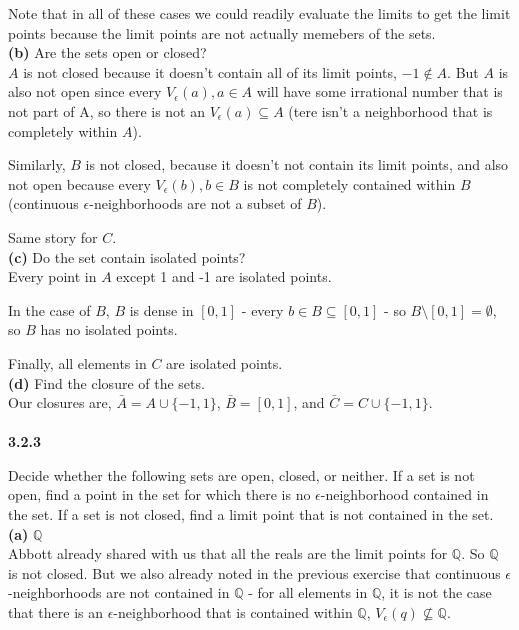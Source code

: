 Note that in all of these cases we could readily evaluate the limits to get the limit points because the limit points
are not actually memebers of the sets.
\\


\textbf{(b)} Are the sets open or closed?
\\

$A$ is not closed because it doesn't contain all of its limit points, $-1 \notin A$.
But $A$ is also not open since every $V_\epsilon (a), a\in A$ will have some irrational number that is not part of A,
so there is not an $V_{\epsilon} (a) \subseteq A$ (tere isn't a neighborhood that is completely within $A$).

Similarly, $B$ is not closed, because it doesn't not contain its limit points, and also not open
because every $V_\epsilon (b), b\in B$ is not completely contained within $B$
(continuous $\epsilon$-neighborhoods are not a subset of $B$).

Same story for $C$.
\\


\textbf{(c)} Do the set contain isolated points?
\\


Every point in $A$ except 1 and -1 are isolated points.

In the case of $B$, $B$ is dense in $[0,1]$ - every $b\in B \subseteq [0,1]$ - so $B \setminus [0,1] = \emptyset$, so
$B$ has no isolated points.

Finally, all elements in $C$ are isolated points.
\\

\textbf{(d)} Find the closure of the sets.
\\

Our closures are, $\bar{A} = A \cup \{-1, 1\}$, $\bar{B} = [0,1]$, and $\bar{C} = C \cup \{-1, 1\}$.
\\~\\



\textbf{3.2.3}

Decide whether the following sets are open, closed, or neither.
If a set is not open, find a point in the set for which there is no $\epsilon$-neighborhood contained in the set.
If a set is not closed, find a limit point that is not contained in the set. 
\\

\textbf{(a)} $\mathbb{Q}$
\\

Abbott already shared with us that all the reals are the limit points for $\mathbb{Q}$.
So $\mathbb{Q}$ is not closed.
But we also already noted in the previous exercise that continuous $\epsilon$-neighborhoods are not contained in
$\mathbb{Q}$ - for all elements in $\mathbb{Q}$, it is not the case that there is an $\epsilon$-neighborhood
that is contained within $\mathbb{Q}$, $V_\epsilon (q) \not\subseteq \mathbb{Q}$.


